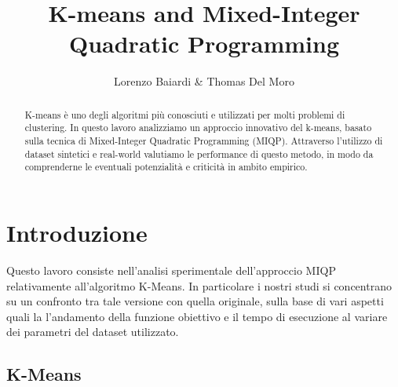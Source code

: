 \documentclass{article}
\title{K-means and Mixed-Integer Quadratic Programming}
\author{Lorenzo Baiardi \& Thomas Del Moro}
\begin{document}
    \maketitle
    \begin{abstract}
        K-means è uno degli algoritmi più conosciuti e utilizzati per molti problemi di clustering. In questo lavoro analizziamo un approccio innovativo del k-means, basato sulla tecnica di Mixed-Integer Quadratic Programming (MIQP). Attraverso l'utilizzo di dataset sintetici e real-world valutiamo le performance di questo metodo, in modo da comprenderne le
        eventuali potenzialità e criticità in ambito empirico.
    \end{abstract}


    \section{Introduzione}

    Questo lavoro consiste nell'analisi sperimentale dell'approccio MIQP relativamente all'algoritmo K-Means. In particolare i nostri studi si concentrano su un confronto tra tale versione con quella originale, sulla base di vari aspetti quali la l'andamento della funzione obiettivo e il tempo di esecuzione al variare dei parametri del dataset utilizzato.

    \subsection{K-Means}
\end{document}

